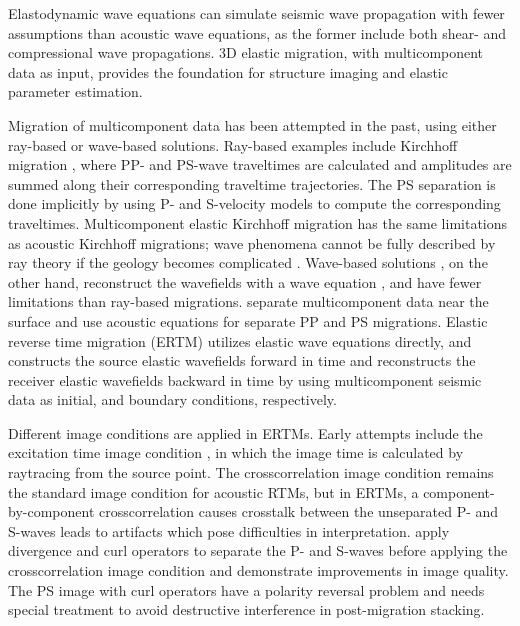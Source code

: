\documentclass[manuscript,ulem,graphix,revised]{geophysics}
\begin{document}
Elastodynamic wave equations can simulate seismic wave propagation with fewer assumptions than acoustic wave equations, as the former include both shear- and compressional wave propagations. 3D elastic migration, with multicomponent data as input, provides the foundation for structure imaging and elastic parameter estimation.

Migration of multicomponent data has been attempted in the past, using either ray-based or wave-based solutions. Ray-based examples include Kirchhoff migration \citep{kuo84, dai86, hokstad00}, where PP- and PS-wave traveltimes are calculated and amplitudes are summed along their corresponding traveltime trajectories. The PS separation is done implicitly by using P- and S-velocity models to compute the corresponding traveltimes. Multicomponent elastic Kirchhoff migration has the same limitations as acoustic Kirchhoff migrations; wave phenomena cannot be fully described by ray theory if the geology becomes complicated \citep{gray01}. Wave-based solutions \citep{chang86,chang94,whitmore95}, on the other hand, reconstruct the wavefields with a wave equation \citep{wapenaar90}, and have fewer limitations than ray-based migrations. \citet{sun01} separate multicomponent data near the surface and use acoustic equations for separate PP and PS migrations. Elastic reverse time migration (ERTM) utilizes elastic wave equations directly, and constructs the source elastic wavefields forward in time and reconstructs the receiver elastic wavefields backward in time by using multicomponent seismic data as initial, and boundary conditions, respectively.

Different image conditions are applied in ERTMs. Early attempts include the excitation time image condition \citep{chang86}, in which the image time is calculated by raytracing from the source point. The crosscorrelation image condition \citep{claerbout85} remains the standard image condition for acoustic RTMs, but in ERTMs, a component-by-component crosscorrelation causes crosstalk between the unseparated P- and S-waves leads to artifacts which pose difficulties in interpretation. \citet{yan08} apply divergence and curl operators to separate the P- and S-waves before applying the crosscorrelation image condition and demonstrate improvements in image quality. The PS image with curl operators have a polarity reversal problem and needs special treatment \citep{du12} to avoid destructive interference in post-migration stacking.
\end{document}
